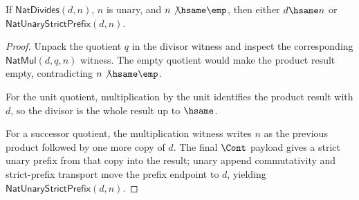 \begin{lemma}
\label{lem:natdivides-result-boundary}
If $\mathsf{NatDivides}(d,n)$, $n$ is unary, and $n\not\hsame\emp$, then
either $d\hsame n$ or $\mathsf{NatUnaryStrictPrefix}(d,n)$.
\end{lemma}
\begin{proof}
Unpack the quotient $q$ in the divisor witness and inspect the corresponding
$\mathsf{NatMul}(d,q,n)$ witness. The empty quotient would make the product
result empty, contradicting $n\not\hsame\emp$.

For the unit quotient, multiplication by the unit identifies the product result
with $d$, so the divisor is the whole result up to $\hsame$.

For a successor quotient, the multiplication witness writes $n$ as the previous
product followed by one more copy of $d$. The final $\Cont$ payload gives a
strict unary prefix from that copy into the result; unary append commutativity
and strict-prefix transport move the prefix endpoint to $d$, yielding
$\mathsf{NatUnaryStrictPrefix}(d,n)$.
\end{proof}
